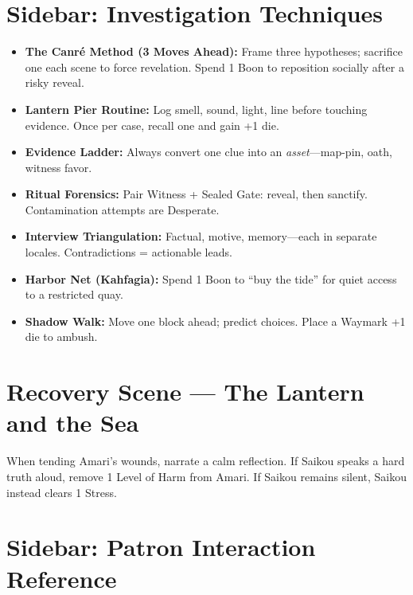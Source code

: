 \documentclass[11pt]{article}
\begin{document}
\section*{Sidebar: Investigation Techniques}
\begin{itemize}
  \item \textbf{The Canré Method (3 Moves Ahead):} Frame three hypotheses; sacrifice one each scene to force revelation. Spend 1 Boon to reposition socially after a risky reveal.
  \item \textbf{Lantern Pier Routine:} Log smell, sound, light, line before touching evidence. Once per case, recall one and gain +1 die.
  \item \textbf{Evidence Ladder:} Always convert one clue into an \emph{asset}---map-pin, oath, witness favor.
  \item \textbf{Ritual Forensics:} Pair Witness + Sealed Gate: reveal, then sanctify. Contamination attempts are Desperate.
  \item \textbf{Interview Triangulation:} Factual, motive, memory---each in separate locales. Contradictions = actionable leads.
  \item \textbf{Harbor Net (Kahfagia):} Spend 1 Boon to ``buy the tide'' for quiet access to a restricted quay.
  \item \textbf{Shadow Walk:} Move one block ahead; predict choices. Place a Waymark +1 die to ambush.
\end{itemize}

\section*{Recovery Scene --- The Lantern and the Sea}
When tending Amari's wounds, narrate a calm reflection.  
If Saikou speaks a hard truth aloud, remove 1 Level of Harm from Amari.  
If Saikou remains silent, Saikou instead clears 1 Stress.

\section*{Sidebar: Patron Interaction Reference}
\end{document}
